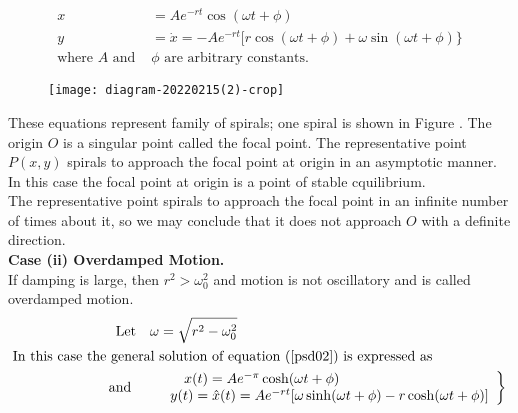\begin{align*}
x&=A e^{-r t} \cos (\omega t+\phi)\\
y&=\dot{x}=-A e^{-r t}[r \cos (\omega t+\phi)+\omega \sin (\omega t+\phi)\}\\
\text{where $A$ and }&\text{$\phi$ are arbitrary constants.}
\end{align*}
\begin{figure}[H]
	\centering
	\texttt{[image: diagram-20220215(2)-crop]}
	\caption{}
	\label{}
\end{figure}
These equations represent family of spirals; one spiral is shown in Figure . The origin $O$ is a singular point called the focal point. The representative point $P(x, y)$ spirals to approach the focal point at origin in an asymptotic manner. In this case the focal point at origin is a point of stable cquilibrium.\\
The representative point spirals to approach the focal point in an infinite number of times about it, so we may conclude that it does not approach $O$ with a definite direction.\\
\textbf{Case (ii) Overdamped Motion. }\\
If damping is large, then $r^{2}>\omega_{0}^{2}$ and motion is not oscillatory and is called overdamped motion.
\begin{align}
\text{Let}\quad \omega&=\sqrt{r^{2}-\omega_{0}^{2}}\notag\\
\text{In this case the general  }&\text{solution of equation $(\ref{psd02})$ is expressed as}\notag\\
\text{and}\qquad
&\left.\begin{array}{l}
\quad x(t)=A e^{-\pi} \cosh (\omega t+\phi) \\
y(t)=\hat{x}(t)=A e^{-r t}[\omega \sinh (\omega t+\phi)-r \cosh (\omega t+\phi)]
\end{array}\right\}\label{psd03}
\end{align}




